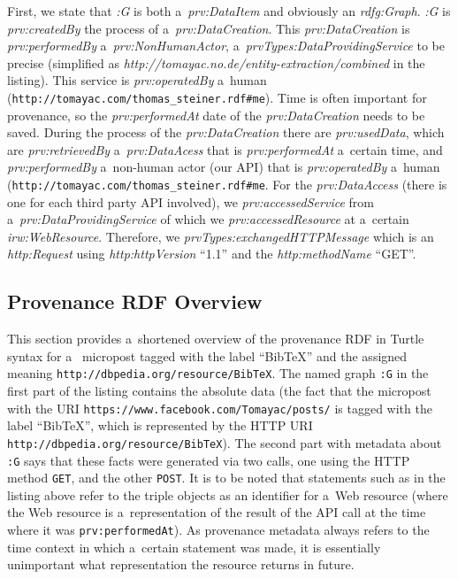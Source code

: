 First, we state that \emph{:G} is both a~\emph{prv:DataItem} and obviously an \emph{rdfg:Graph}. \emph{:G} is \emph{prv:createdBy} the process of a~\emph{prv:DataCreation}. This \emph{prv:DataCreation} is \emph{prv:performedBy} a~\emph{prv:NonHumanActor}, a~\emph{prvTypes:DataProvidingService} to be precise (simplified as \emph{http://tomayac.no.de/entity-extraction/combined} in the listing). This service is \emph{prv:operatedBy} a~human (\texttt{http://tomayac.com/thomas\_steiner.rdf\#me}). Time is often important for provenance, so the \emph{prv:performedAt} date of the \emph{prv:DataCreation} needs to be saved. During the process of the \emph{prv:DataCreation} there are \emph{prv:usedData}, which are \emph{prv:retrievedBy} a~\emph{prv:DataAcess} that is \emph{prv:performedAt} a~certain time, and \emph{prv:performedBy} a~non-human actor (our API) that is \emph{prv:operatedBy} a~human (\texttt{http://tomayac.com/thomas\_steiner.rdf\#me}. For the \emph{prv:DataAccess} (there is one for each third party API involved), we \emph{prv:accessedService} from a~\emph{prv:DataProvidingService} of which we \emph{prv:accessedResource} at a~certain \emph{irw:WebResource}. Therefore, we \emph{prvTypes:exchangedHTTPMessage} which is an \emph{http:Request} using \emph{http:httpVersion} ``1.1'' and the \emph{http:methodName} ``GET''.

\subsection{Provenance RDF Overview}                                           \label{sec:appendix}
This section provides a~shortened overview of the provenance RDF in Turtle syntax for a~ micropost tagged with the label ``BibTeX'' and the assigned
meaning \texttt{http://dbpedia.org/resource/BibTeX}. The named graph \texttt{:G} in the first part of the listing contains the absolute data (the fact that the  micropost with the URI \texttt{https://www.facebook.com/Tomayac/posts/} is tagged with the label ``BibTeX'', which is represented by the HTTP URI \texttt{http://dbpedia.org/resource/BibTeX}). The second part with metadata about \texttt{:G} says that these facts were generated via two calls, one using the HTTP method \texttt{GET}, and the other \texttt{POST}.
It is to be noted that statements such as in the listing above refer to the triple objects as an identifier for a~Web resource (where the Web resource is a~representation of the result of the API call at the time where it was \texttt{prv:performedAt}). As provenance metadata always refers to the time context in which a~certain statement was made, it is essentially unimportant what representation the resource returns in future.

